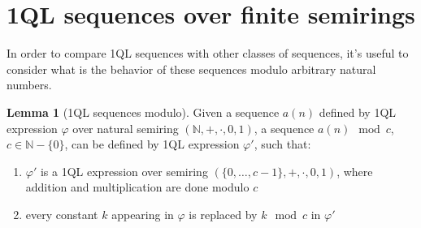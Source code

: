 \documentclass[12pt]{article}
\theoremstyle{definition}
\newtheorem{lemma}[theorem]{Lemma}
\begin{document}



\section{1QL sequences over finite semirings}
In order to compare 1QL sequences with other classes of sequences, it's useful to consider what is the behavior of these sequences modulo arbitrary natural numbers.

\begin{lemma}[1QL sequences modulo]
    Given a sequence $a(n)$ defined by 1QL expression $\varphi$ over natural semiring $(\mathbb{N}, +, \cdot, 0, 1)$, a sequence $a(n) \mod c$, $c \in \mathbb{N} - \{0\}$, can be defined by 1QL expression $\varphi'$, such that:
    \begin{enumerate}
        \item $\varphi'$ is a 1QL expression over semiring $(\{0,\ldots,c-1\}, +, \cdot, 0, 1)$, where addition and multiplication are done modulo $c$
        \item every constant $k$ appearing in $\varphi$ is replaced by $k \mod c$ in $\varphi'$
    \end{enumerate}
\end{lemma}
\end{document}
